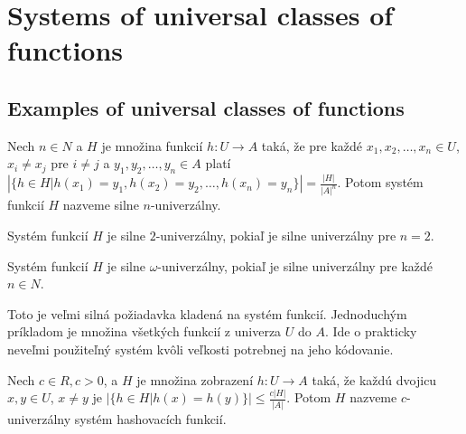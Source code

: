 \chapter{Systems of universal classes of functions}

\section{Examples of universal classes of functions}

\begin{definition}
\label{strong_universal_n_system}
Nech $n \in N$ a $H$ je množina funkcií $h: U \rightarrow A$ taká, že pre každé $x_1, x_2, \dots, x_n \in U$, $x_i \neq x_j$ pre $i \neq j$ a $y_1, y_2, \dots, y_n \in A$ platí $\left|\lbrace h \in H | h(x_1) = y_1, h(x_2) = y_2, \dots, h(x_n) = y_n \rbrace \right| = \frac{|H|}{|A|^n}$. Potom systém funkcií $H$ nazveme silne $n$-univerzálny.
\end{definition}

\begin{definition}
\label{strong_universal_2_system}
Systém funkcií $H$ je silne $2$-univerzálny, pokiaľ je silne univerzálny pre $n = 2$.
\end{definition}

\begin{definition}
\label{strong_universal_omega_system}
Systém funkcií $H$ je silne $\omega$-univerzálny, pokiaľ je silne univerzálny pre každé $n \in N$.
\end{definition}

Toto je veľmi silná požiadavka kladená na systém funkcií. Jednoduchým prí\-kladom je množina všetkých funkcií z univerza $U$ do $A$. Ide o prakticky neveľmi použiteľný systém kvôli veľkosti potrebnej na jeho kódovanie. 

\begin{definition}
\label{c_universal_system}
Nech $c \in R, c > 0$, a $H$ je množina zobrazení $h: U \rightarrow A$ taká, že každú dvojicu $x, y \in U$, $x \neq y$ je $\left| \lbrace h \in H | h(x) = h(y) \rbrace \right| \leq \frac {c |H|}{|A|}$. Potom $H$ nazveme $c$-univerzálny systém hashovacích funkcií.
\end{definition}

